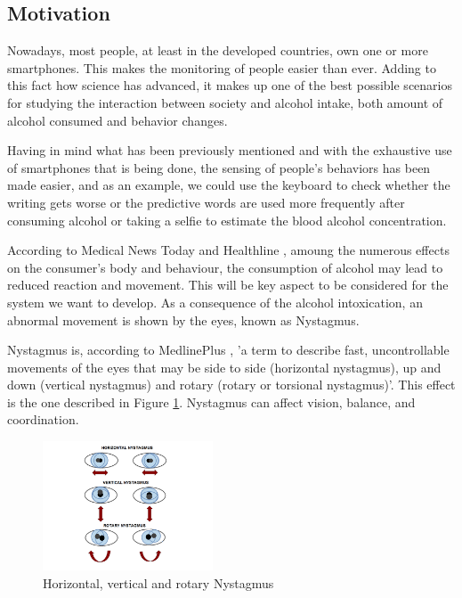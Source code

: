   \subsection{Motivation}

  Nowadays, most people, at least in the developed countries, own one or more smartphones. This makes the monitoring of people easier than ever. Adding to this fact how science has advanced, it makes up one of the best possible scenarios for studying the interaction between society and alcohol intake, both amount of alcohol consumed and behavior changes.

  Having in mind what has been previously mentioned and with the exhaustive use of smartphones that is being done, the sensing of people's behaviors has been made easier, and as an example, we could use the keyboard to check whether the writing gets worse or the predictive words are used more frequently after consuming alcohol or taking a selfie to estimate the blood alcohol concentration.

  According to Medical News Today \cite{mnt} and Healthline \cite{healthline}, amoung the numerous effects on the consumer's body and behaviour, the consumption of alcohol may lead to reduced reaction and movement. This will be key aspect to be considered for the system we want to develop. As a consequence of the alcohol intoxication, an abnormal movement is shown by the eyes, known as Nystagmus.

  Nystagmus is, according to MedlinePlus \cite{Nystagmus}, 'a term to describe fast, uncontrollable movements of the eyes that may be side to side (horizontal nystagmus), up and down (vertical nystagmus) and rotary (rotary or torsional nystagmus)'. This effect is the one described in Figure \ref{nystagmuses}. Nystagmus can affect vision, balance, and coordination.

  \begin{figure}[H]
      \centering
      \includegraphics[width=0.45\textwidth]{./img/nystagmuses.png}
      \caption{Horizontal, vertical and rotary Nystagmus}
      \label{nystagmuses}
  \end{figure}

